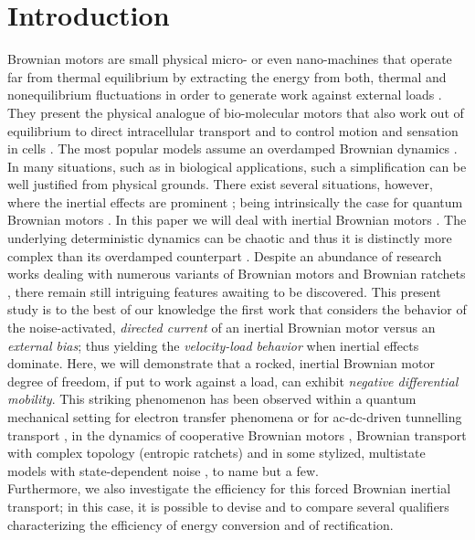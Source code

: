 \documentclass{elsart}
\begin{document}
\section{Introduction}
\label{intro} Brownian motors are small physical micro- or even
nano-machines that operate far from thermal equilibrium by
extracting the energy from both, thermal and nonequilibrium
fluctuations in order to generate work against external loads
\cite{HanBar1996,Astumian:Today,Reimann:Ratchets,ReiHan2002,Linke2002,HanAnn05}.
They present the physical analogue of bio-molecular motors that also
work out of equilibrium to direct intracellular transport and to
control motion and sensation in cells \cite{Julicher1997}.
%
The most popular models assume an overdamped Brownian dynamics
\cite{bartussek94,luczka1995,Hanepl1996,KosLuc2001,noriepl04,noripre04}.
In many situations, such as in biological applications, such a
simplification can be well justified from physical grounds.  There
exist several situations, however, where the inertial effects are
prominent \cite{pollak93,borromeo2000}; being intrinsically the case
for quantum Brownian motors \cite{reimann97,goychuk98}. In this
paper we will deal with inertial Brownian motors
\cite{jung96,mateos1,lindner:inertia,Sintes2002,Son2003,sengupta2004,machura1,machura2}.
The underlying deterministic dynamics can be chaotic
\cite{jung96,mateos1,sengupta2004,family1,barbi2000} and thus it is
distinctly more complex than its overdamped counterpart
\cite{bartussek94,Bartussek1996}. Despite an abundance of research
works dealing with numerous variants of Brownian motors and Brownian
ratchets
\cite{HanBar1996,Astumian:Today,Reimann:Ratchets,ReiHan2002,Linke2002,HanAnn05},
there remain still intriguing features awaiting to be discovered.
This present study is to the best of our knowledge the first work
that considers the behavior of the noise-activated, {\it directed
current} of an inertial Brownian motor versus an {\it external
bias}; thus yielding the {\it velocity-load behavior} when inertial
effects dominate. Here, we will demonstrate that a rocked, inertial
Brownian motor degree of freedom, if put to work against a load, can
exhibit {\it negative
  differential mobility}. This striking phenomenon has been observed
within a quantum mechanical setting for electron transfer phenomena
\cite{NavCan1976} or for ac-dc-driven tunnelling transport
\cite{Hartmann1997}, in the dynamics of cooperative Brownian motors
\cite{BroBen2000,BroCle2002,EicRei2004b}, Brownian transport with
complex topology (entropic ratchets)
\cite{White1984,Balakrishnan1995,CecMag1996,Slater1997,EicRei2002a,EicRei2002b}
and in some stylized, multistate models with state-dependent noise
\cite{CleBro2002,HalMan2004}, to name but a few.\\
%
Furthermore, we also investigate the efficiency for this forced
Brownian inertial transport; in this case, it is possible to devise
and to compare several qualifiers characterizing the efficiency of
energy conversion and of rectification.
\end{document}
